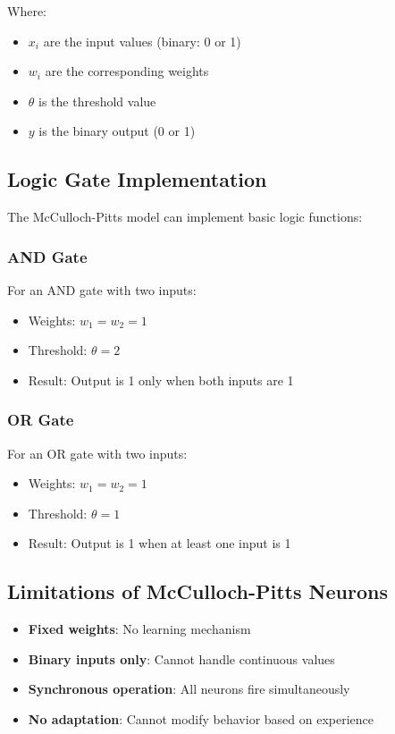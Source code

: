 Where:
\begin{itemize}
    \item $x_i$ are the input values (binary: 0 or 1)
    \item $w_i$ are the corresponding weights
    \item $\theta$ is the threshold value
    \item $y$ is the binary output (0 or 1)
\end{itemize}

\subsection{Logic Gate Implementation}
The McCulloch-Pitts model can implement basic logic functions:

\subsubsection{AND Gate}
For an AND gate with two inputs:
\begin{itemize}
    \item Weights: $w_1 = w_2 = 1$
    \item Threshold: $\theta = 2$
    \item Result: Output is 1 only when both inputs are 1
\end{itemize}

\subsubsection{OR Gate}
For an OR gate with two inputs:
\begin{itemize}
    \item Weights: $w_1 = w_2 = 1$
    \item Threshold: $\theta = 1$
    \item Result: Output is 1 when at least one input is 1
\end{itemize}

\subsection{Limitations of McCulloch-Pitts Neurons}
\begin{itemize}
    \item \textbf{Fixed weights}: No learning mechanism
    \item \textbf{Binary inputs only}: Cannot handle continuous values
    \item \textbf{Synchronous operation}: All neurons fire simultaneously
    \item \textbf{No adaptation}: Cannot modify behavior based on experience
\end{itemize}

